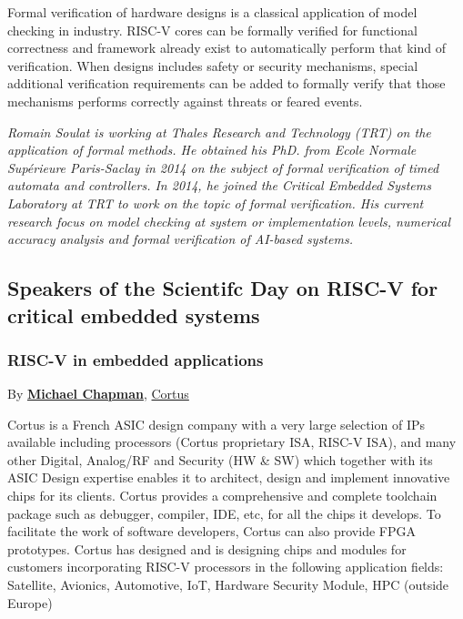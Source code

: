 \documentclass[a4paper, 10pt]{article}
\begin{document}
{Formal verification of hardware designs is a classical application of
model checking in industry. RISC-V cores can be formally verified for
functional correctness and framework already exist to automatically
perform that kind of verification. When designs includes safety or
security mechanisms, special additional verification requirements can
be added to formally verify that those mechanisms performs correctly
against threats or feared events.

\emph{\footnotesize Romain Soulat is working at Thales Research and Technology (TRT) on the application of formal methods. He obtained his PhD. from Ecole Normale Supérieure Paris-Saclay in 2014 on the subject of formal verification of timed automata and controllers. In 2014, he joined the Critical Embedded Systems Laboratory at TRT to work on the topic of formal verification. His current research focus on model checking at system or implementation levels, numerical accuracy analysis and formal verification of AI-based systems.}
\subsection{Speakers of the Scientifc Day on RISC-V for critical embedded systems}
\label{sec:org066b013}
\subsubsection{RISC-V in embedded applications}
\label{sec:orge622757}
By \textbf{\href{https://www.linkedin.com/michael-chapman-at-cortus}{Michael Chapman}}, \href{https://www.cortus.com}{Cortus}

Cortus is a French ASIC design company with a very large selection of IPs
available including processors (Cortus proprietary ISA, RISC-V ISA), and many
other Digital, Analog/RF and Security (HW \& SW) which together with its ASIC
Design expertise enables it to architect, design and implement innovative chips
for its clients.
Cortus provides a comprehensive and complete toolchain package such as debugger,
compiler, IDE, etc, for all the chips it develops.
To facilitate the work of software developers, Cortus can also provide FPGA
prototypes.
Cortus has designed and is designing chips and modules for customers
incorporating RISC-V processors in the following application fields: Satellite,
Avionics, Automotive, IoT, Hardware Security Module, HPC (outside Europe)

}
\end{document}
